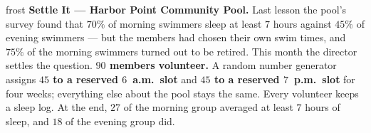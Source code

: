 \documentclass[10pt]{article}
\begin{document}

\vspace{0.15in}

\begin{headlinebox}{frost}
\small
\textbf{Settle It --- Harbor Point Community Pool.} Last lesson the pool's
survey found that $70\%$ of morning swimmers sleep at least $7$ hours against
$45\%$ of evening swimmers --- but the members had chosen their own swim times,
and $75\%$ of the morning swimmers turned out to be retired. This month the
director settles the question. \textbf{$90$ members volunteer.} A random number
generator assigns \textbf{$45$ to a reserved $6$~a.m.\ slot} and \textbf{$45$ to
a reserved $7$~p.m.\ slot} for four weeks; everything else about the pool stays
the same. Every volunteer keeps a sleep log. At the end, \textbf{$27$} of the
morning group averaged at least $7$ hours of sleep, and \textbf{$18$} of the
evening group did.
\end{headlinebox}

\vspace{0.03in}
\end{document}
